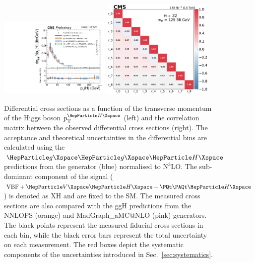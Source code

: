 

\begin{center}
	\begin{figure}[!htbp]
		\centering
		\includegraphics[width=0.48\textwidth]{Images/H4L/pT4l_unfoldwith_SM_125_asimov.pdf}
		\includegraphics[width=0.48\textwidth]{Images/H4L/correlations/corr_pT4l_v3.pdf}\\
		\caption{
			Differential cross sections as a function of the transverse momentum of the Higgs boson $\pt^{\PH}$ (left) and the correlation matrix between the observed differential cross sections (right). 
			The acceptance and theoretical uncertainties in the differential bins are calculated using the $\ggH$ predictions from the \POWHEG generator (blue) normalised to $\mathrm{N^3LO}$.
			The sub-dominant component of the signal ($\VBF + \VH + \ttH$) is denoted as XH and are fixed to the SM.
			The measured cross sections are also compared with the ggH predictions from the NNLOPS (orange) and MadGraph\_aMC@NLO (pink) generators.
			The black points represent the measured fiducial cross sections in each bin, while the black error bars represent the total uncertainty on each measurement.
			The red boxes depict the systematic components of the uncertainties introduced in Sec.~\ref{sec:systematics}.
			\label{fig:fidPTH}}
	\end{figure}
\end{center}

